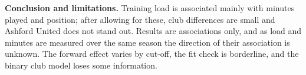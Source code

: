 \documentclass[11pt,a4paper]{article}
\begin{document}
\textbf{Conclusion and limitations.} Training load is associated mainly with minutes played and position; after allowing for these, club differences are small and Ashford United does not stand out. Results are associations only, and as load and minutes are measured over the same season the direction of their association is unknown. The forward effect varies by cut-off, the fit check is borderline, and the binary club model loses some information.
\end{document}
